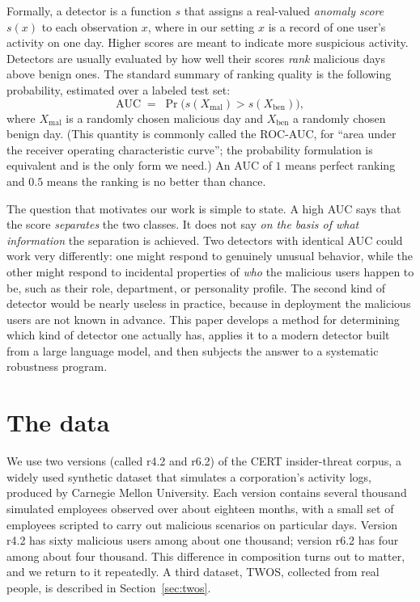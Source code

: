 \documentclass[10pt]{article}
\begin{document}
Formally, a detector is a function $s$ that assigns a real-valued
\emph{anomaly score} $s(x)$ to each observation $x$, where in our
setting $x$ is a record of one user's activity on one day. Higher
scores are meant to indicate more suspicious activity. Detectors are
usually evaluated by how well their scores \emph{rank} malicious days
above benign ones. The standard summary of ranking quality is the
following probability, estimated over a labeled test set:
\begin{equation}
\mathrm{AUC} \;=\; \Pr\bigl( s(X_{\mathrm{mal}}) > s(X_{\mathrm{ben}})
\bigr),
\label{eq:auc}
\end{equation}
where $X_{\mathrm{mal}}$ is a randomly chosen malicious day and
$X_{\mathrm{ben}}$ a randomly chosen benign day. (This quantity is
commonly called the ROC-AUC, for ``area under the receiver operating
characteristic curve''; the probability formulation is equivalent and is
the only form we need.) An AUC of $1$ means perfect ranking and $0.5$
means the ranking is no better than chance.

The question that motivates our work is simple to state. A high AUC
says that the score \emph{separates} the two classes. It does not say
\emph{on the basis of what information} the separation is achieved. Two
detectors with identical AUC could work very differently: one might
respond to genuinely unusual behavior, while the other might respond to
incidental properties of \emph{who} the malicious users happen to be,
such as their role, department, or personality profile. The second kind
of detector would be nearly useless in practice, because in deployment
the malicious users are not known in advance. This paper develops a
method for determining which kind of detector one actually has, applies
it to a modern detector built from a large language model, and then
subjects the answer to a systematic robustness program.

\section{The data}
\label{sec:data}

We use two versions (called r4.2 and r6.2) of the CERT insider-threat
corpus, a widely used synthetic dataset that simulates a corporation's
activity logs, produced by Carnegie Mellon University. Each version
contains several thousand simulated employees observed over about
eighteen months, with a small set of employees scripted to carry out
malicious scenarios on particular days. Version r4.2 has sixty
malicious users among about one thousand; version r6.2 has four among
about four thousand. This difference in composition turns out to
matter, and we return to it repeatedly. A third dataset, TWOS,
collected from real people, is described in
Section~\ref{sec:twos}.
\end{document}
